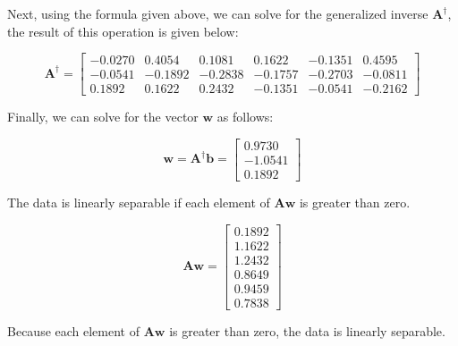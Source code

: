 \documentclass[fleqn]{article}
\begin{document}
\begin{enumerate}
		Next, using the formula given above, we can solve for the generalized inverse $\mathbf{A}^{\dag}$, the result of this operation is given below:
		
		\begin{equation*}
			\mathbf{A}^{\dag} = \begin{bmatrix} 
			   -0.0270 &  0.4054 &  0.1081 &  0.1622 & -0.1351 &  0.4595 \\
			   -0.0541 & -0.1892 & -0.2838 & -0.1757 & -0.2703 & -0.0811 \\
			    0.1892 &  0.1622 &  0.2432 & -0.1351 & -0.0541 & -0.2162
			\end{bmatrix}
		\end{equation*}
		
		Finally, we can solve for the vector $\mathbf{w}$ as follows:
		
		\begin{equation*}
			\mathbf{w} = \mathbf{A}^{\dag}\mathbf{b} = \begin{bmatrix} 0.9730 \\ -1.0541 \\ 0.1892 \end{bmatrix}
		\end{equation*}
		
		The data is linearly separable if each element of $\mathbf{A}\mathbf{w}$ is greater than zero.
		
		\begin{equation*}
			\mathbf{A}\mathbf{w} = \begin{bmatrix}
				0.1892 \\
    				1.1622 \\
   	 			1.2432 \\
    				0.8649 \\
    				0.9459 \\
    				0.7838
			\end{bmatrix}
		\end{equation*}
		
		Because each element of $\mathbf{A}\mathbf{w}$ is greater than zero, the data is linearly separable.
		
	\end{enumerate}
\end{document}
